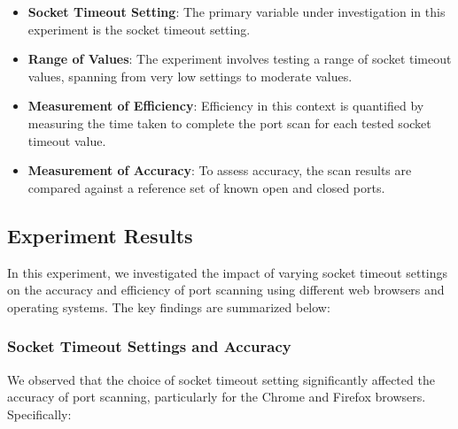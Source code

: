 \begin{itemize}
  \item \textbf{Socket Timeout Setting}: The primary variable under investigation in this experiment is the socket timeout setting.
  
  \item \textbf{Range of Values}: The experiment involves testing a range of socket timeout values, spanning from very low settings to moderate values.
  
  \item \textbf{Measurement of Efficiency}: Efficiency in this context is quantified by measuring the time taken to complete the port scan for each tested socket timeout value.
  
  \item \textbf{Measurement of Accuracy}: To assess accuracy, the scan results are compared against a reference set of known open and closed ports.
\end{itemize}





\subsection{Experiment Results}

In this experiment, we investigated the impact of varying socket timeout settings on the accuracy and efficiency of port scanning using different web browsers and operating systems. The key findings are summarized below:

\subsubsection{Socket Timeout Settings and Accuracy}

We observed that the choice of socket timeout setting significantly affected the accuracy of port scanning, particularly for the Chrome and Firefox browsers. Specifically:

